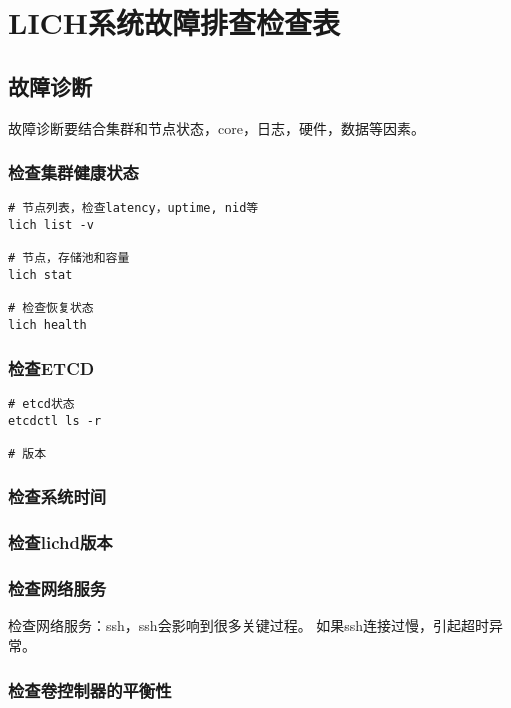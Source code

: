 \chapter{LICH系统故障排查检查表}

\section{故障诊断}

故障诊断要结合集群和节点状态，core，日志，硬件，数据等因素。

\subsection{检查集群健康状态}

\begin{lstlisting}
# 节点列表，检查latency，uptime, nid等
lich list -v

# 节点，存储池和容量
lich stat

# 检查恢复状态
lich health
\end{lstlisting}

\subsection{检查ETCD}

\begin{lstlisting}
# etcd状态
etcdctl ls -r

# 版本
\end{lstlisting}

\subsection{检查系统时间}

\subsection{检查lichd版本}

\subsection{检查网络服务}

检查网络服务：ssh，ssh会影响到很多关键过程。
如果ssh连接过慢，引起超时异常。

\subsection{检查卷控制器的平衡性}

